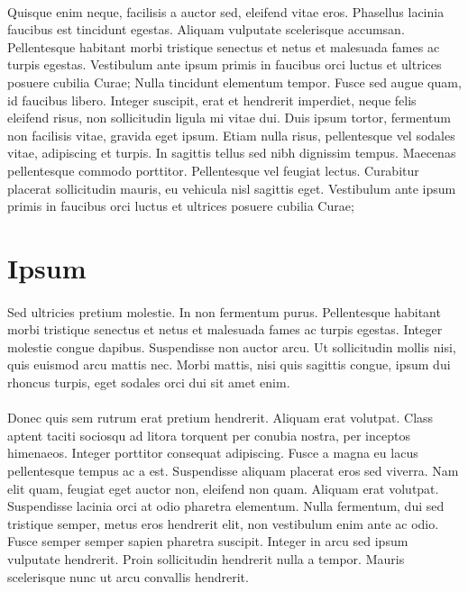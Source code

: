 \paragraph{}
Quisque enim neque, facilisis a auctor sed, eleifend vitae eros. Phasellus lacinia faucibus est tincidunt egestas. Aliquam vulputate scelerisque accumsan. Pellentesque habitant morbi tristique senectus et netus et malesuada fames ac turpis egestas. Vestibulum ante ipsum primis in faucibus orci luctus et ultrices posuere cubilia Curae; Nulla tincidunt elementum tempor. Fusce sed augue quam, id faucibus libero. Integer suscipit, erat et hendrerit imperdiet, neque felis eleifend risus, non sollicitudin ligula mi vitae dui. Duis ipsum tortor, fermentum non facilisis vitae, gravida eget ipsum. Etiam nulla risus, pellentesque vel sodales vitae, adipiscing et turpis. In sagittis tellus sed nibh dignissim tempus. Maecenas pellentesque commodo porttitor. Pellentesque vel feugiat lectus. Curabitur placerat sollicitudin mauris, eu vehicula nisl sagittis eget. Vestibulum ante ipsum primis in faucibus orci luctus et ultrices posuere cubilia Curae;

\section{Ipsum}
\paragraph{}
Sed ultricies pretium molestie. In non fermentum purus. Pellentesque habitant morbi tristique senectus et netus et malesuada fames ac turpis egestas. Integer molestie congue dapibus. Suspendisse non auctor arcu. Ut sollicitudin mollis nisi, quis euismod arcu mattis nec. Morbi mattis, nisi quis sagittis congue, ipsum dui rhoncus turpis, eget sodales orci dui sit amet enim.

\paragraph{}
Donec quis sem rutrum erat pretium hendrerit. Aliquam erat volutpat. Class aptent taciti sociosqu ad litora torquent per conubia nostra, per inceptos himenaeos. Integer porttitor consequat adipiscing. Fusce a magna eu lacus pellentesque tempus ac a est. Suspendisse aliquam placerat eros sed viverra. Nam elit quam, feugiat eget auctor non, eleifend non quam. Aliquam erat volutpat. Suspendisse lacinia orci at odio pharetra elementum. Nulla fermentum, dui sed tristique semper, metus eros hendrerit elit, non vestibulum enim ante ac odio. Fusce semper semper sapien pharetra suscipit. Integer in arcu sed ipsum vulputate hendrerit. Proin sollicitudin hendrerit nulla a tempor. Mauris scelerisque nunc ut arcu convallis hendrerit.

